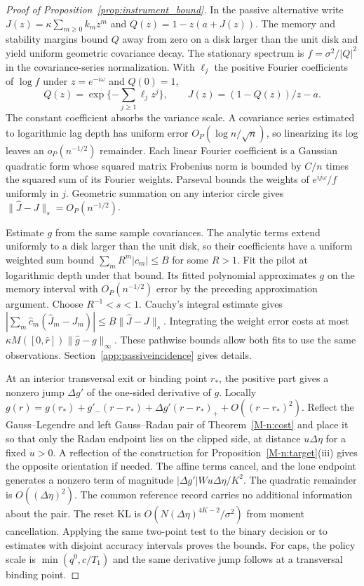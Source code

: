 \documentclass[12pt]{article}
\theoremstyle{definition}
\theoremstyle{remark}
\begin{document}
\begin{proof}[Proof of Proposition~\ref{prop:instrument_bound}]
In the passive alternative write $J(z)=\kappa\sum_{m\ge0}k_mz^m$ and $Q(z)=1-z(a+J(z))$. The memory and stability margins bound $Q$ away from zero on a disk larger than the unit disk and yield uniform geometric covariance decay. The stationary spectrum is $f=\sigma^2/|Q|^2$ in the covariance-series normalization. With $\ell_j$ the positive Fourier coefficients of $\log f$ under $z=e^{-i\omega}$ and $Q(0)=1$,
\[
 Q(z)=\exp\{-\textstyle\sum_{j\ge1}\ell_j z^j\},\qquad J(z)=(1-Q(z))/z-a .
\]
The constant coefficient absorbs the variance scale. A covariance series estimated to logarithmic lag depth has uniform error $O_P(\log n/\sqrt n)$, so linearizing its log leaves an $o_P(n^{-1/2})$ remainder. Each linear Fourier coefficient is a Gaussian quadratic form whose squared matrix Frobenius norm is bounded by $C/n$ times the squared sum of its Fourier weights. Parseval bounds the weights of $e^{ij\omega}/f$ uniformly in $j$. Geometric summation on any interior circle gives $\|\hat J-J\|_s=O_P(n^{-1/2})$.

Estimate $g$ from the same sample covariances. The analytic terms extend uniformly to a disk larger than the unit disk, so their coefficients have a uniform weighted sum bound $\sum_m R^m|c_m|\le B$ for some $R>1$. Fit the pilot at logarithmic depth under that bound. Its fitted polynomial approximates $g$ on the memory interval with $O_P(n^{-1/2})$ error by the preceding approximation argument. Choose $R^{-1}<s<1$. Cauchy's integral estimate gives $|\sum_m\hat c_m(\hat J_m-J_m)|\le B\|\hat J-J\|_s$. Integrating the weight error costs at most $\kappa M([0,\bar r])\|\hat g-g\|_\infty$. These pathwise bounds allow both fits to use the same observations. Section~\ref{app:passiveincidence} gives details.

At an interior transversal exit or binding point $r_*$, the positive part gives a nonzero jump $\Delta g'$ of the one-sided derivative of $g$. Locally $g(r)=g(r_*)+g'_-(r-r_*)+\Delta g'(r-r_*)_++O((r-r_*)^2)$. Reflect the Gauss--Legendre and left Gauss--Radau pair of Theorem~\ref{M-n:cost} and place it so that only the Radau endpoint lies on the clipped side, at distance $u\Delta\eta$ for a fixed $u>0$. A reflection of the construction for Proposition~\ref{M-n:target}(iii) gives the opposite orientation if needed. The affine terms cancel, and the lone endpoint generates a nonzero term of magnitude $|\Delta g'|Wu\Delta\eta/K^2$. The quadratic remainder is $O((\Delta\eta)^2)$. The common reference record carries no additional information about the pair. The reset KL is $O(N(\Delta\eta)^{4K-2}/\sigma^2)$ from moment cancellation. Applying the same two-point test to the binary decision or to estimates with disjoint accuracy intervals proves the bounds. For caps, the policy scale is $\min(q^0,c/T_1)$ and the same derivative jump follows at a transversal binding point.
\end{proof}
\end{document}
